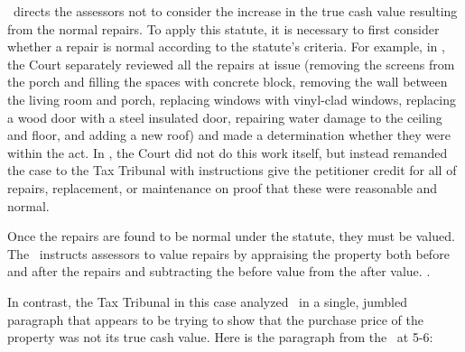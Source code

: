\documentclass[12pt,\documentclassflag]{michiganCourtOfAppealsBrief}
\def\mathieuGast{\pincite[l]{MCL}{211.27(2)}}
\begin{document}
\mathieuGast\ directs the assessors not to consider the increase in the true cash value resulting from the normal repairs. To apply this statute, it is necessary to first consider whether a repair is normal according to the statute's criteria. For example, in \cite{Coyne}, the Court separately reviewed all the repairs at issue (removing the screens from the porch and filling the spaces with concrete block, removing the wall between the living room and porch, replacing windows with vinyl-clad windows, replacing a wood door with a steel insulated door, repairing water damage to the ceiling and floor, and adding a new roof) and made a determination whether they were within the act. In \cite{Fisher}, the Court did not do this work itself, but instead remanded the case to the Tax Tribunal with instructions give the petitioner credit for all of repairs, replacement, or maintenance on proof that these were reasonable and normal.

Once the repairs are found to be normal under the statute, they must be valued. The \STC\ instructs assessors to value repairs by appraising the property both before and after the repairs and subtracting the before value from the after value. .

In contrast, the Tax Tribunal in this case analyzed \mathieuGast\ in a single, jumbled paragraph that appears to be trying to show that the purchase price of the property was not its true cash value. Here is the paragraph from the \POJ\ at 5-6:
\end{document}
